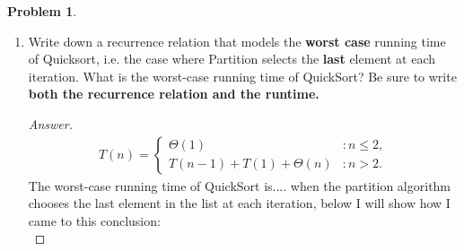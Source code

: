 \documentclass[11pt]{article}
\theoremstyle{definition}
\theoremstyle{definition}
\newtheorem{required}{Problem}
\theoremstyle{definition}
\begin{document}
\begin{required}
\begin{enumerate}[label=(\alph*)]
\begin{proof}[Answer]
I will now solve for T(n): \\
\begin{align*}
T(n) &= \textrm{(cost of base case) · (number of times the base case is reached)} + \sum_{i=0}^{\log_2 n - 1}  2^{i} * \frac{n}{2^i} \\
&= \Theta(1) * 2^k +  \sum_{i=0}^{\log_2 n - 1}  2^{i} * \frac{n}{2^i} \\
&= \Theta(1) * 2^{\log_2 n-1} + \sum_{i=0}^{\log_2 n - 1}  n \\
&= \Theta(1) * 2^{\log_2 n-1} + n(\log_2 n - 1) \\
&= \Theta(1) * 2^{\log_2 n-1} + n\log_2 n - n \\
&= \Theta(1) * 2^{\log_2 n} * 2^-1 + n\log_2 n - n \\
&= \Theta(1) * n * \frac{1}{2} *  n\log_2 n - n \\
&= \frac{\Theta(1)}{2} + n\log_2 n - n \\
T(n) &= \Theta(n\log n)
\end{align*}
From the above we can see that the best case running time of the algorithm Quicksort will be: \\
\begin{center}
$T(n) = \Theta(n\log n)$
\end{center}
\end{proof}


\newpage 
\subsection{Part \ref{S20b}}
\item \label{S20b} Write down a recurrence relation that models the {\bf worst case} running time of Quicksort, i.e. the case where {\sc Partition} selects the {\bf last} element at each iteration. What is the worst-case running time of QuickSort? Be sure to write \textbf{both the recurrence relation and the runtime.}

\begin{proof}[Answer]
\begin{align*}
T(n) = \begin{cases}
\Theta(1) & : n \leq 2, \\
T(n-1) + T(1) + \Theta(n) & : n > 2.
\end{cases}
\end{align*}
The worst-case running time of QuickSort is.... when the partition algorithm chooses the last element in the list at each iteration, below I will show how I came to this conclusion: \\


\end{proof}
\end{enumerate}
\end{required}
\end{document}
